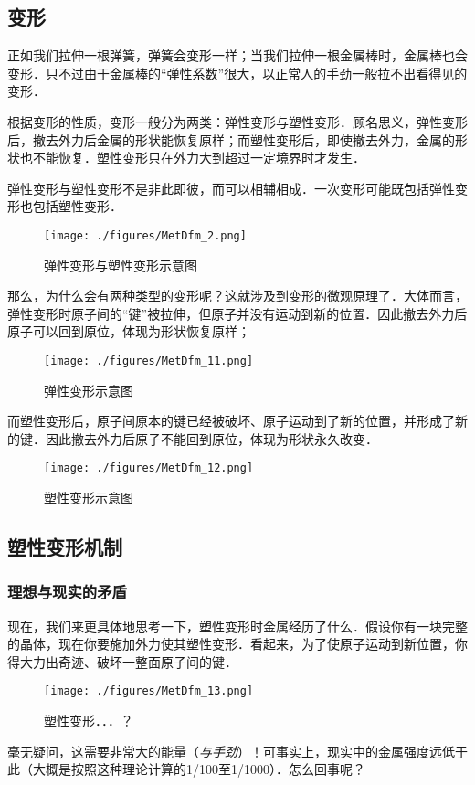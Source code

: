 
\subsection{变形}
正如我们拉伸一根弹簧，弹簧会变形一样；当我们拉伸一根金属棒时，金属棒也会变形．只不过由于金属棒的“弹性系数”很大，以正常人的手劲一般拉不出看得见的变形．

\begin{example}{}
\begin{figure}[ht]
\centering
\texttt{[image: ./figures/MetDfm\_1.png]}
\caption{框架结构}} \label{MetDfm_fig1}
\end{figure}
与弹簧类似，金属结构提供的支持力也源自金属的细微变形．．．只要在安全的范围内．
\end{example}

根据变形的性质，变形一般分为两类：弹性变形与塑性变形．顾名思义，弹性变形后，撤去外力后金属的形状能恢复原样；而塑性变形后，即使撤去外力，金属的形状也不能恢复．塑性变形只在外力大到超过一定境界时才发生．

弹性变形与塑性变形不是非此即彼，而可以相辅相成．一次变形可能既包括弹性变形也包括塑性变形．

\begin{figure}[ht]
\centering
\texttt{[image: ./figures/MetDfm\_2.png]}
\caption{弹性变形与塑性变形示意图} \label{MetDfm_fig2}
\end{figure}

那么，为什么会有两种类型的变形呢？这就涉及到变形的微观原理了．大体而言，弹性变形时原子间的“键”被拉伸，但原子并没有运动到新的位置．因此撤去外力后原子可以回到原位，体现为形状恢复原样；
\begin{figure}[ht]
\centering
\texttt{[image: ./figures/MetDfm\_11.png]}
\caption{弹性变形示意图} \label{MetDfm_fig11}
\end{figure}
而塑性变形后，原子间原本的键已经被破坏、原子运动到了新的位置，并形成了新的键．因此撤去外力后原子不能回到原位，体现为形状永久改变．
\begin{figure}[ht]
\centering
\texttt{[image: ./figures/MetDfm\_12.png]}
\caption{塑性变形示意图} \label{MetDfm_fig12}
\end{figure}

\subsection{塑性变形机制}

\subsubsection{理想与现实的矛盾}
现在，我们来更具体地思考一下，塑性变形时金属经历了什么．假设你有一块完整的晶体，现在你要施加外力使其塑性变形．看起来，为了使原子运动到新位置，你得大力出奇迹、破坏一整面原子间的键．
\begin{figure}[ht]
\centering
\texttt{[image: ./figures/MetDfm\_13.png]}
\caption{塑性变形．．．？} \label{MetDfm_fig13}
\end{figure}
毫无疑问，这需要非常大的能量（\textsl{与手劲}）！可事实上，现实中的金属强度远低于此（大概是按照这种理论计算的1/100至1/1000）．怎么回事呢？

